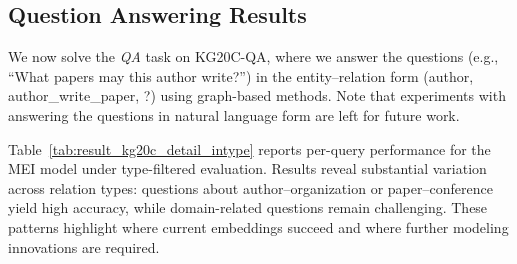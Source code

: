 \documentclass[conference]{IEEEtran}
\begin{document}
%

\subsection{Question Answering Results}

We now solve the \textit{QA} task on KG20C-QA, where we answer the questions (e.g., ``What papers may this author write?'') in the entity--relation form (author, author\_write\_paper, ?) using graph-based methods. Note that experiments with answering the questions in natural language form are left for future work.

Table~\ref{tab:result_kg20c_detail_intype} reports per-query performance for the MEI model under type-filtered evaluation. Results reveal substantial variation across relation types: questions about author--organization or paper--conference yield high accuracy, while domain-related questions remain challenging. These patterns highlight where current embeddings succeed and where further modeling innovations are required.
\end{document}
